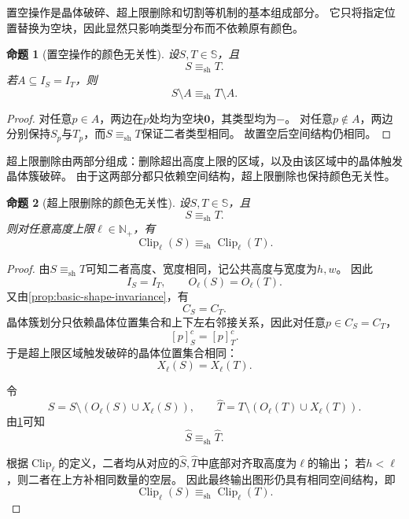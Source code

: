 \documentclass[UTF8,fontset=none]{ctexart}
\theoremstyle{cnthm}
\newtheorem{proposition}{命题}[section]
\begin{document}
			置空操作是晶体破碎、超上限删除和切割等机制的基本组成部分。
			它只将指定位置替换为空块，因此显然只影响类型分布而不依赖原有颜色。
			
			\begin{proposition}[置空操作的颜色无关性]\label{prop:emptying-shape-invariance}
				设$S,T\in\mathbb{S}$，且
				$$
				S\equiv_{\mathrm{sh}}T.
				$$
				若$A\subseteq I_S=I_T$，则
				$$
				S\setminus A
				\equiv_{\mathrm{sh}}
				T\setminus A.
				$$
			\end{proposition}
			
			\begin{proof}
				对任意$p\in A$，两边在$p$处均为空块$\mathbf{0}$，其类型均为$-$。
				对任意$p\notin A$，两边分别保持$S_p$与$T_p$，而$S\equiv_{\mathrm{sh}}T$保证二者类型相同。
				故置空后空间结构仍相同。
			\end{proof}
			
			超上限删除由两部分组成：删除超出高度上限的区域，以及由该区域中的晶体触发晶体簇破碎。
			由于这两部分都只依赖空间结构，超上限删除也保持颜色无关性。
			
			\begin{proposition}[超上限删除的颜色无关性]\label{prop:clip-shape-invariance}
				设$S,T\in\mathbb{S}$，且
				$$
				S\equiv_{\mathrm{sh}}T.
				$$
				则对任意高度上限$\ell\in\mathbb{N}_{+}$，有
				$$
				\operatorname{Clip}_{\ell}(S)
				\equiv_{\mathrm{sh}}
				\operatorname{Clip}_{\ell}(T).
				$$
			\end{proposition}
			
			\begin{proof}
				由$S\equiv_{\mathrm{sh}}T$可知二者高度、宽度相同，记公共高度与宽度为$h,w$。
				因此
				$$
				I_S=I_T,
				\qquad
				O_\ell(S)=O_\ell(T).
				$$
				又由\cref{prop:basic-shape-invariance}，有
				$$
				C_S=C_T.
				$$
				晶体簇划分只依赖晶体位置集合和上下左右邻接关系，因此对任意$p\in C_S=C_T$，
				$$
				[p]^c_S=[p]^c_T.
				$$
				于是超上限区域触发破碎的晶体位置集合相同：
				$$
				X_\ell(S)=X_\ell(T).
				$$
				
				令
				$$
				\widehat S=S\setminus(O_\ell(S)\cup X_\ell(S)),
				\qquad
				\widehat T=T\setminus(O_\ell(T)\cup X_\ell(T)).
				$$
				由\cref{prop:emptying-shape-invariance}可知
				$$
				\widehat S\equiv_{\mathrm{sh}}\widehat T.
				$$
				
				根据$\operatorname{Clip}_\ell$的定义，二者均从对应的$\widehat S,\widehat T$中底部对齐取高度为$\ell$的输出；
				若$h<\ell$，则二者在上方补相同数量的空层。
				因此最终输出图形仍具有相同空间结构，即
				$$
				\operatorname{Clip}_{\ell}(S)
				\equiv_{\mathrm{sh}}
				\operatorname{Clip}_{\ell}(T).
				$$
			\end{proof}
			
\end{document}
